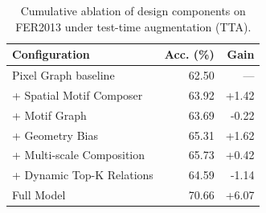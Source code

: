 \begin{table}[htbp]
\centering
\caption{Cumulative ablation of design components on FER2013 under test-time augmentation (TTA).}
\label{tab:cumulative_ablation}
\begin{tabular}{lrr}
\toprule
\textbf{Configuration} & \textbf{Acc. (\%)} & \textbf{Gain} \\
\midrule
Pixel Graph baseline & 62.50 & --- \\
+ Spatial Motif Composer & 63.92 & +1.42 \\
+ Motif Graph & 63.69 & -0.22 \\
+ Geometry Bias & 65.31 & +1.62 \\
+ Multi-scale Composition & 65.73 & +0.42 \\
+ Dynamic Top-K Relations & 64.59 & -1.14 \\
Full Model & 70.66 & +6.07 \\
\bottomrule
\end{tabular}
\end{table}
